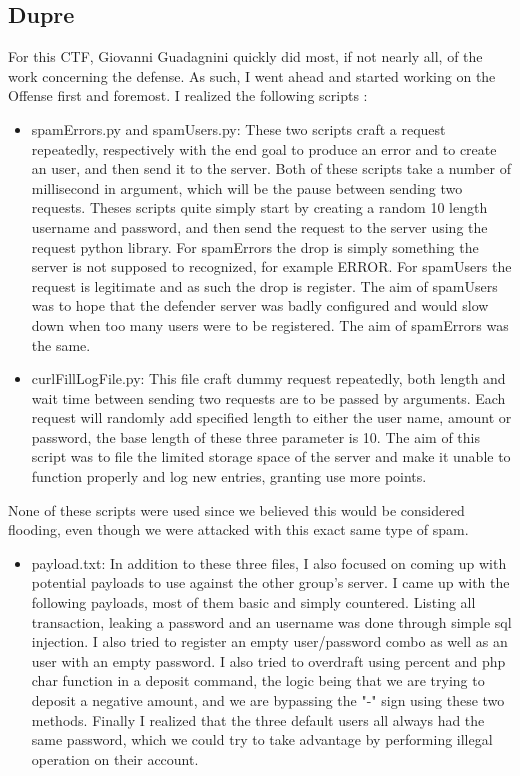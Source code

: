 \documentclass[14pt]{article}
\begin{document}
\subsection{Dupre}
For this CTF, Giovanni Guadagnini quickly did most, if not nearly all, of the work concerning the defense. As such, I went ahead and started working on the Offense first and foremost. I realized the following scripts :
\begin{itemize}
	\item spamErrors.py and spamUsers.py: These two scripts craft a request repeatedly, respectively with the end goal to produce an error and to create an user, and then send it to the server. Both of these scripts take a number of millisecond in argument, which will be the pause between sending two requests. Theses scripts quite simply start by creating a random 10 length username and password, and then send the request to the server using the request python library. For spamErrors the drop is simply something the server is not supposed to recognized, for example ERROR. For  spamUsers the request is legitimate and as such the drop is register. The aim of spamUsers  was to hope that the defender server was badly configured and would slow down when too many users were to be registered. The aim of spamErrors was the same.
	
	\item curlFillLogFile.py: This file craft dummy request repeatedly, both length and wait time between sending two requests are to be passed by arguments. Each request will randomly add specified length to either the user name, amount or password, the base length of these three parameter is 10. The aim of this script was to file the limited storage space of the server and make it unable to function properly and log new entries, granting use more points. 
\end{itemize}

None of these scripts were used since we believed this would be considered flooding, even though we were attacked with this exact same type of spam.

\begin{itemize}
	\item payload.txt: In addition to these three files, I also focused on coming up with potential payloads to use against the other group's server. I came up with the following payloads, most of them basic and simply countered. Listing all transaction, leaking a password and an username was done through simple sql injection. I also tried to register an empty user/password combo as well as an user with an empty password. I also tried to overdraft using percent and php char function in a deposit command, the logic being that we are trying to deposit a negative amount, and we are bypassing the "-" sign using these two methods. Finally I realized that the three default users all always had the same password, which we could try to take advantage by performing illegal operation on their account. 
\end{itemize}
\end{document}
